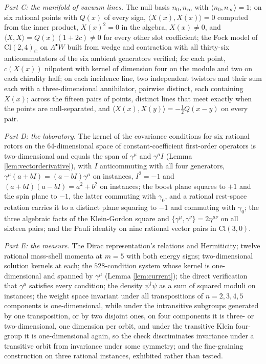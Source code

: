 \documentclass[11pt]{article}
\theoremstyle{definition}
\newcommand{\Cl}{\mathrm{Cl}}
\newcommand{\C}{\mathbb{C}}
\newcommand{\ip}[2]{\langle #1, #2\rangle}
\begin{document}
\emph{Part C: the manifold of vacuum lines.} The null basis $n_{0}, n_{\infty}$ with $\ip{n_{0}}{n_{\infty}} = 1$; on six rational points with $Q(x)$ of every sign, $\ip{X(x)}{X(x)} = 0$ computed from the inner product, $X(x)^{2} = 0$ in the algebra, $X(x) \neq 0$, and $\ip{X}{X} = Q(x)(1+2c) \neq 0$ for every other slot coefficient; the Fock model of $\Cl(2,4)_{\C}$ on $\Lambda^{\bullet}W$ built from wedge and contraction with all thirty-six anticommutators of the six ambient generators verified; for each point, $c(X(x))$ nilpotent with kernel of dimension four on the module and two on each chirality half; on each incidence line, two independent twistors and their sum each with a three-dimensional annihilator, pairwise distinct, each containing $X(x)$; across the fifteen pairs of points, distinct lines that meet exactly when the points are null-separated, and $\ip{X(x)}{X(y)} = -\tfrac12 Q(x-y)$ on every pair.

\emph{Part D: the laboratory.} The kernel of the covariance conditions for six rational rotors on the $64$-dimensional space of constant-coefficient first-order operators is two-dimensional and equals the span of $\gamma^{\mu}$ and $\gamma^{\mu}I$ (Lemma \ref{lem:vectorderivative}), with $I$ anticommuting with all four generators, $\gamma^{\mu}(a+bI) = (a-bI)\gamma^{\mu}$ on instances, $I^{2} = -1$ and $(a+bI)(a-bI) = a^{2} + b^{2}$ on instances; the boost plane squares to $+1$ and the spin plane to $-1$, the latter commuting with $\gamma_{0}$, and a rational rest-space rotation carries it to a distinct plane squaring to $-1$ and commuting with $\gamma_{0}$; the three algebraic facts of the Klein-Gordon square and $\{\gamma^{\mu}, \gamma^{\nu}\} = 2\eta^{\mu\nu}$ on all sixteen pairs; and the Pauli identity on nine rational vector pairs in $\Cl(3,0)$.

\emph{Part E: the measure.} The Dirac representation's relations and Hermiticity; twelve rational mass-shell momenta at $m = 5$ with both energy signs; two-dimensional solution kernels at each; the $528$-condition system whose kernel is one-dimensional and spanned by $\gamma^{\mu}$ (Lemma \ref{lem:current}); the direct verification that $\gamma^{\mu}$ satisfies every condition; the density $\psi^{\dagger}\psi$ as a sum of squared moduli on instances; the weight space invariant under all transpositions of $n = 2, 3, 4, 5$ components is one-dimensional, while under the intransitive subgroups generated by one transposition, or by two disjoint ones, on four components it is three- or two-dimensional, one dimension per orbit, and under the transitive Klein four-group it is one-dimensional again, so the check discriminates invariance under a transitive orbit from invariance under some symmetry; and the fine-graining construction on three rational instances, exhibited rather than tested.
\end{document}

